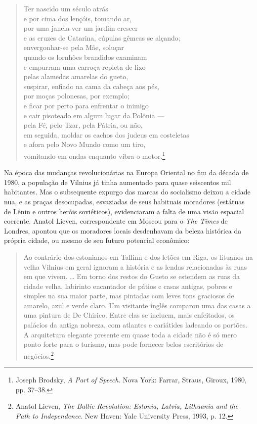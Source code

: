 %
\begin{verse}
Ter nascido um século atrás\\
e por cima dos lençóis, tomando ar,\\
por uma janela ver um jardim crescer\\
e as cruzes de Catarina, cúpulas gêmeas se alçando;\\
envergonhar-se pela Mãe, soluçar\\
quando os lornhões brandidos examinam\\
e empurram uma carroça repleta de lixo\\
pelas alamedas amarelas do gueto,\\
suspirar, enfiado na cama da cabeça aos pés,\\
por moças polonesas, por exemplo;\\
e ficar por perto para enfrentar o inimigo\\
e cair pisoteado em algum lugar da Polônia ---\\
pela Fé, pelo Tzar, pela Pátria, ou não,\\
em seguida, moldar os cachos dos judeus em \qb{}costeletas\\
e afora pelo Novo Mundo como um tiro,\\
vomitando em ondas enquanto vibra o motor.\footnote{Joseph Brodsky, \textit{A Part of Speech}. Nova York: Farrar, Straus, Giroux, 1980, pp. 37--38.}
\end{verse}

Na época das mudanças revolucionárias na Europa Oriental no fim da
década de 1980, a população de Vilnius já tinha aumentado para quase
seiscentos mil habitantes. Mas o subsequente expurgo das marcas do
socialismo deixou a cidade nua, e as praças desocupadas, esvaziadas de
seus habituais moradores (estátuas de Lênin e outros heróis
soviéticos), evidenciaram a falta de uma visão espacial coerente. Anatol
Lieven, correspondente em Moscou para o \textit{The Times} de Londres,
apontou que os moradores locais desdenhavam da beleza histórica da
própria cidade, ou mesmo de seu futuro potencial econômico:

\begin{quote}
Ao contrário dos estonianos em Tallinn e dos letões em Riga, os lituanos
na velha Vilnius em geral ignoram a história e as lendas relacionadas às
ruas em que vivem. \ldots{} Em torno dos restos do Gueto se estendem as
ruas da cidade velha, labirinto encantador de pátios e casas antigas,
pobres e simples na sua maior parte, mas pintadas com leves tons
graciosos de amarelo, azul e verde claro. Um visitante inglês comparou
uma das casas a uma pintura de De Chirico. Entre elas se incluem, mais
enfeitados, os palácios da antiga nobreza, com atlantes e cariátides
ladeando os portões. A arquitetura elegante presente em quase toda a
cidade não é só mero ponto forte para o turismo, mas pode fornecer belos
escritórios de negócios.\footnote{Anatol Lieven, \textit{The Baltic Revolution: Estonia, Latvia, Lithuania and the Path to Independence}. New Haven: Yale University Press, 1993, p. 12.} \end{quote}


